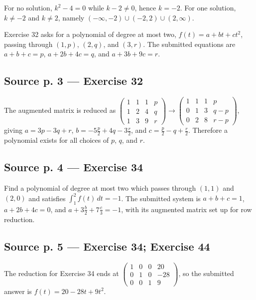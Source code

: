 For no solution, \(k^{2} - 4 = 0\) while \(k - 2 \neq 0\), hence \(k = - 2\). For one solution, \(k \neq - 2\) and \(k \neq 2\), namely \(\left( {- \infty, - 2} \right) \cup \left( {- 2,2} \right) \cup \left( {2,\infty} \right)\).

Exercise 32 asks for a polynomial of degree at most two, \(f(t) = a + bt + ct^{2}\), passing through \(\left( {1,p} \right)\), \(\left( {2,q} \right)\), and \(\left( {3,r} \right)\). The submitted equations are \(a + b + c = p\), \(a + 2b + 4c = q\), and \(a + 3b + 9c = r\).

\subsection{Source p. 3 --- Exercise 32}

The augmented matrix is reduced as \(\begin{pmatrix}
1 & 1 & 1 & p \\
1 & 2 & 4 & q \\
1 & 3 & 9 & r
\end{pmatrix}\rightarrow\begin{pmatrix}
1 & 1 & 1 & p \\
0 & 1 & 3 & {q - p} \\
0 & 2 & 8 & {r - p}
\end{pmatrix}\), giving \(a = 3p - 3q + r\), \(b = - 5\frac{p}{2} + 4q - 3\frac{r}{2}\), and \(c = \frac{p}{2} - q + \frac{r}{2}\). Therefore a polynomial exists for all choices of \(p\), \(q\), and \(r\).

\subsection{Source p. 4 --- Exercise 34}

Find a polynomial of degree at most two which passes through \(\left( {1,1} \right)\) and \(\left( {2,0} \right)\) and satisfies \(\int_{1}^{2}f(t)\, dt = - 1\). The submitted system is \(a + b + c = 1\), \(a + 2b + 4c = 0\), and \(a + 3\frac{b}{2} + 7\frac{c}{3} = - 1\), with its augmented matrix set up for row reduction.

\subsection{Source p. 5 --- Exercise 34; Exercise 44}

The reduction for Exercise 34 ends at \(\begin{pmatrix}
1 & 0 & 0 & 20 \\
0 & 1 & 0 & {- 28} \\
0 & 0 & 1 & 9
\end{pmatrix}\), so the submitted answer is \(f(t) = 20 - 28t + 9t^{2}\).

